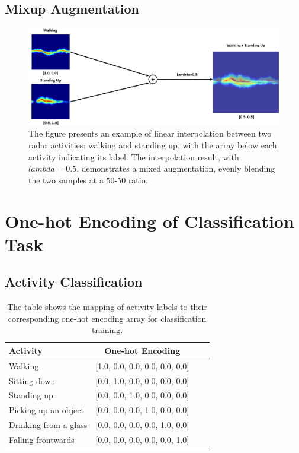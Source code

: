 \documentclass{l4proj}
\begin{document}
\begin{appendices}
\subsection{Mixup Augmentation}
\begin{figure}[h]
    \centering
    \includegraphics[width=0.93\linewidth]{images/mixup_augmentation.png}
    \caption{The figure presents an example of linear interpolation between two radar activities: walking and standing up, with the array below each activity indicating its label. The interpolation result, with $lambda=0.5$, demonstrates a mixed augmentation, evenly blending the two samples at a 50-50 ratio.}
    \label{fig:mixup_augmentation}
\end{figure}

\newpage

\section{One-hot Encoding of Classification Task}
\subsection{Activity Classification}
\begin{table}[h]
    \centering
    \begin{tabular}{|l|c|c|c|}
        \hline
        \rowcolor{lightgray}
        \textbf{Activity} & \textbf{One-hot Encoding}\\
        \hline
        Walking & [1.0, 0.0, 0.0, 0.0, 0.0, 0.0]\\
        \hline
        Sitting down & [0.0, 1.0, 0.0, 0.0, 0.0, 0.0]\\
        \hline
        Standing up & [0.0, 0.0, 1.0, 0.0, 0.0, 0.0]\\
        \hline
        Picking up an object & [0.0, 0.0, 0.0, 1.0, 0.0, 0.0]\\
        \hline
        Drinking from a glass & [0.0, 0.0, 0.0, 0.0, 1.0, 0.0]\\
        \hline
        Falling frontwards & [0.0, 0.0, 0.0, 0.0, 0.0, 1.0]\\
        \hline
    \end{tabular}
    \caption{The table shows the mapping of activity labels to their corresponding one-hot encoding array for classification training.}
    \label{tab:one-hot_encoding_activity}
\end{table}


\end{appendices}
\end{document}
